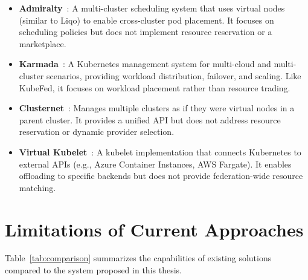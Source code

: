 \begin{itemize}
    \item \textbf{Admiralty}~\cite{admiralty}: A multi-cluster scheduling system that uses virtual nodes (similar to Liqo) to enable cross-cluster pod placement. It focuses on scheduling policies but does not implement resource reservation or a marketplace.

    \item \textbf{Karmada}~\cite{karmada}: A Kubernetes management system for multi-cloud and multi-cluster scenarios, providing workload distribution, failover, and scaling. Like KubeFed, it focuses on workload placement rather than resource trading.

    \item \textbf{Clusternet}~\cite{clusternet}: Manages multiple clusters as if they were virtual nodes in a parent cluster. It provides a unified API but does not address resource reservation or dynamic provider selection.

    \item \textbf{Virtual Kubelet}~\cite{virtual-kubelet}: A kubelet implementation that connects Kubernetes to external APIs (e.g., Azure Container Instances, AWS Fargate). It enables offloading to specific backends but does not provide federation-wide resource matching.
\end{itemize}


\section{Limitations of Current Approaches}
\label{sec:limitations}

Table~\ref{tab:comparison} summarizes the capabilities of existing solutions compared to the system proposed in this thesis.

